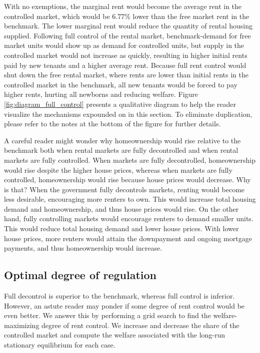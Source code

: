 \documentclass[parskip=full]{article}
\begin{document}
With no exemptions, the marginal rent would become the average rent in the controlled market, which would be 6.77\% lower than the free market rent in the benchmark. The lower marginal rent would reduce the quantity of rental housing supplied. Following full control of the rental market, benchmark-demand for free market units would show up as demand for controlled units, but supply in the controlled market would not increase as quickly, resulting in higher initial rents paid by new tenants and a higher average rent. Because full rent control would shut down the free rental market, where rents are lower than initial rents in the controlled market in the benchmark, all new tenants would be forced to pay higher rents, hurting all newborns and reducing welfare. Figure \ref{fig:diagram_full_control} presents a qualitative diagram to help the reader visualize the mechanisms expounded on in this section. To eliminate duplication, please refer to the notes at the bottom of the figure for further details.

A careful reader might wonder why homeownership would rise relative to the benchmark both when rental markets are fully decontrolled and when rental markets are fully controlled. When markets are fully decontrolled, homeownership would rise despite the higher house prices, whereas when markets are fully controlled, homeownership would rise because house prices would decrease. Why is that? When the government fully decontrols markets, renting would become less desirable, encouraging more renters to own. This would increase total housing demand and homeownership, and thus house prices would rise. On the other hand, fully controlling markets would encourage renters to demand smaller units. This would reduce total housing demand and lower house prices. With lower house prices, more renters would attain the downpayment and ongoing mortgage payments, and thus homeownership would increase.

\subsection{Optimal degree of regulation}

Full decontrol is superior to the benchmark, whereas full control is inferior. However, an astute reader may ponder if some degree of rent control would be even better. We answer this by performing a grid search to find the welfare-maximizing degree of rent control. We increase and decrease the share of the controlled market and compute the welfare associated with the long-run stationary equilibrium for each case. 
\end{document}
